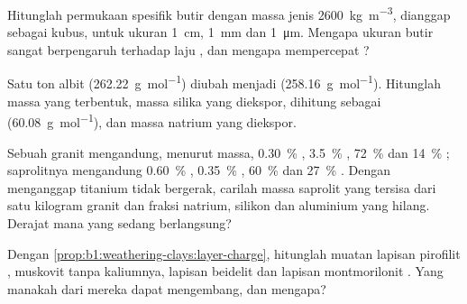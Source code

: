 \begin{exercise}[$\star\star$]\label{exo:b1:weathering-clays:5}
Hitunglah permukaan spesifik butir  dengan massa jenis \qty{2600}{kg.m^{-3}}, dianggap sebagai kubus, untuk ukuran \qty{1}{cm}, \qty{1}{mm} dan \qty{1}{\micro m}. Mengapa ukuran butir sangat berpengaruh terhadap laju , dan mengapa  mempercepat ?
\end{exercise}

\begin{exercise}[$\star\star$]\label{exo:b1:weathering-clays:6}
Satu ton albit  (\qty{262.22}{g.mol^{-1}}) diubah menjadi  (\qty{258.16}{g.mol^{-1}}). Hitunglah massa  yang terbentuk, massa silika yang diekspor, dihitung sebagai  (\qty{60.08}{g.mol^{-1}}), dan massa natrium yang diekspor.
\end{exercise}

\begin{exercise}[$\star\star$]\label{exo:b1:weathering-clays:7}
Sebuah granit mengandung, menurut massa, \qty{0.30}{\percent} , \qty{3.5}{\percent}
, \qty{72}{\percent}  dan \qty{14}{\percent} ; saprolitnya mengandung \qty{0.60}{\percent} , \qty{0.35}{\percent}
, \qty{60}{\percent}  dan \qty{27}{\percent} .
Dengan menganggap titanium tidak bergerak, carilah massa saprolit yang tersisa dari satu kilogram granit dan fraksi natrium, silikon dan aluminium yang hilang. Derajat  mana yang sedang berlangsung?
\end{exercise}

\begin{exercise}[$\star\star$]\label{exo:b1:weathering-clays:8}
Dengan \cref{prop:b1:weathering-clays:layer-charge}, hitunglah muatan lapisan pirofilit , muskovit  tanpa kaliumnya, lapisan beidelit  dan lapisan montmorilonit . Yang manakah dari mereka dapat mengembang, dan mengapa?
\end{exercise}

